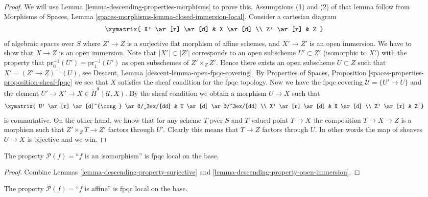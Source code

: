 \begin{proof}
We will use
Lemma \ref{lemma-descending-properties-morphisms}
to prove this. Assumptions (1) and (2) of that lemma follow from
Morphisms of Spaces,
Lemma \ref{spaces-morphisms-lemma-closed-immersion-local}.
Consider a cartesian diagram
$$
\xymatrix{
X' \ar[r] \ar[d] & X \ar[d] \\
Z' \ar[r] & Z
}
$$
of algebraic spaces over $S$
where $Z' \to Z$ is a surjective flat morphism of affine schemes,
and $X' \to Z'$ is an open immersion. We have to show that $X \to Z$
is an open immersion. Note that $|X'| \subset |Z'|$ corresponds to an
open subscheme $U' \subset Z'$ (isomorphic to $X'$)
with the property that $\text{pr}_0^{-1}(U') = \text{pr}_1^{-1}(U')$
as open subschemes of $Z' \times_Z Z'$. Hence there exists an open
subscheme $U \subset Z$ such that $X' = (Z' \to Z)^{-1}(U)$, see
Descent, Lemma \ref{descent-lemma-open-fpqc-covering}.
By Properties of Spaces,
Proposition \ref{spaces-properties-proposition-sheaf-fpqc}
we see that $X$ satisfies the sheaf condition for the fpqc topology.
Now we have the fpqc covering $\mathcal{U} = \{U' \to U\}$
and the element $U' \to X' \to X \in \check{H}^0(\mathcal{U}, X)$.
By the sheaf condition we obtain a morphism $U \to X$ such that
$$
\xymatrix{
U' \ar[r] \ar[d]^{\cong} \ar@/_3ex/[dd] & U \ar[d] \ar@/^3ex/[dd] \\
X' \ar[r] \ar[d] & X \ar[d] \\
Z' \ar[r] & Z
}
$$
is commutative. On the other hand, we know that for any scheme $T$ pver $S$
and $T$-valued point $T \to X$ the composition $T \to X \to Z$ is a
morphism such that $Z' \times_Z T \to Z'$ factors through $U'$. Clearly
this means that $T \to Z$ factors through $U$. In other words the map
of sheaves $U \to X$ is bijective and we win.
\end{proof}

\begin{lemma}
\label{lemma-descending-property-isomorphism}
The property $\mathcal{P}(f) =$``$f$ is an isomorphism''
is fpqc local on the base.
\end{lemma}

\begin{proof}
Combine Lemmas \ref{lemma-descending-property-surjective}
and \ref{lemma-descending-property-open-immersion}.
\end{proof}

\begin{lemma}
\label{lemma-descending-property-affine}
The property $\mathcal{P}(f) =$``$f$ is affine''
is fpqc local on the base.
\end{lemma}

